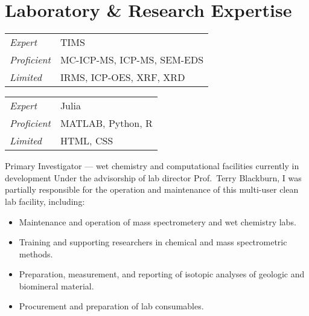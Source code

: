 \section{Laboratory \& Research Expertise}

\begin{tabular}{ll}
	\itshape Expert & TIMS \\
	\itshape Proficient & MC-ICP-MS, ICP-MS, SEM-EDS \\
	\itshape Limited & IRMS, ICP-OES, XRF, XRD
\end{tabular}

\begin{tabular}{ll}
	\itshape Expert & Julia \\
	\itshape Proficient & MATLAB, Python, R \\
	\itshape Limited & HTML, CSS
\end{tabular}

Primary Investigator --- wet chemistry and computational facilities currently in development
Under the advisorship of lab director Prof.~Terry Blackburn, I was partially responsible for the operation and maintenance of this multi-user clean lab facility, including:
	\begin{itemize} 
	\item Maintenance and operation of mass spectrometery and wet chemistry labs.
	\item Training and supporting researchers in chemical and mass spectrometric methods.
	\item Preparation, measurement, and reporting of isotopic analyses of geologic and biomineral material.
	\item Procurement and preparation of lab consumables.
	\end{itemize}